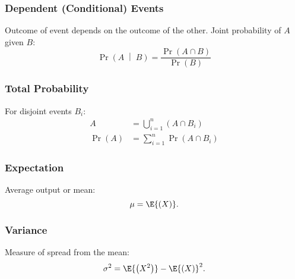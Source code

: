 \documentclass{article}
\begin{document}
\begin{multicols}{3}
    \subsubsection*{Dependent (Conditional) Events}
    Outcome of event depends on the outcome of the other. Joint probability of $A$ given $B$:
    \begin{equation*}
        \Pr{\left(A \;\middle|\; B\right)} = \frac{\Pr{\left( A \cap B \right)}}{\Pr{\left( B \right)}}
    \end{equation*}
    \subsubsection*{Total Probability}
    For disjoint events $B_i$:
    \begin{align*}
        A                     & = \bigcup\limits_{i=1}^n \left( A \cap B_i \right) \\
        \Pr{\left( A \right)} & = \sum_{i=1}^n \Pr{\left( A \cap B_i \right)}
    \end{align*}
    \subsubsection*{Expectation}
    Average output or mean:
    \begin{equation*}
        \mu = \E{\left( X \right)}.
    \end{equation*}
    \subsubsection*{Variance}
    Measure of spread from the mean:
    \begin{equation*}
        \sigma^2 = \E{\left( X^2 \right)} - \E{\left( X \right)}^2.
    \end{equation*}
\end{multicols}
\end{document}
